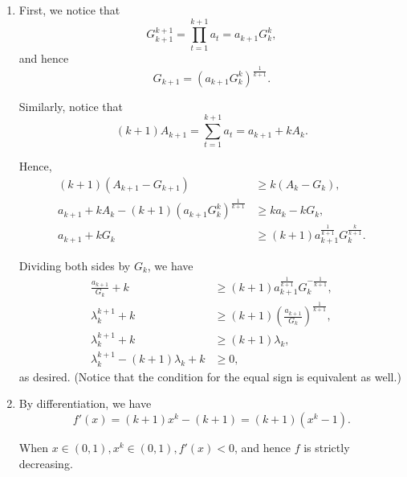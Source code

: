 \Question{\currfilebase}

\begin{enumerate}
    \item First, we notice that
          \[
              G_{k + 1}^{k + 1} = \prod_{t = 1}^{k + 1} a_t = a_{k + 1} G_{k}^{k},
          \]
          and hence
          \[
              G_{k + 1} = \left(a_{k + 1} G_{k}^{k}\right)^{\frac{1}{k + 1}}.
          \]

          Similarly, notice that
          \[
              (k + 1) A_{k + 1} = \sum_{t = 1}^{k + 1} a_t = a_{k + 1} + k A_{k}.
          \]

          Hence,
          \begin{align*}
              (k + 1)\left(A_{k + 1} - G_{k + 1}\right)                                      & \geq k\left(A_k - G_k\right),                                    \\
              a_{k + 1} + k A_k - (k + 1) \left(a_{k + 1} G_{k}^{k}\right)^{\frac{1}{k + 1}} & \geq k a_k - k G_k,                                              \\
              a_{k + 1} + k G_k                                                              & \geq (k + 1)a_{k + 1}^{\frac{1}{k + 1}} G_{k}^{\frac{k}{k + 1}}.
          \end{align*}

          Dividing both sides by \(G_k\), we have
          \begin{align*}
              \frac{a_{k + 1}}{G_k} + k                 & \geq (k + 1) a_{k + 1}^{\frac{1}{k + 1}} G_k^{- \frac{1}{k + 1}},  \\
              \lambda_k^{k + 1} + k                     & \geq (k + 1) \left(\frac{a_{k + 1}}{G_k}\right)^{\frac{1}{k + 1}}, \\
              \lambda_k^{k + 1} + k                     & \geq (k + 1) \lambda_k,                                            \\
              \lambda_k^{k + 1} - (k + 1) \lambda_k + k & \geq 0,
          \end{align*}
          as desired. (Notice that the condition for the equal sign is equivalent as well.)

    \item By differentiation, we have
          \[
              f'(x) = (k + 1)x^k - (k + 1) = (k + 1) (x^k - 1).
          \]

          When \(x \in (0, 1), x^k \in (0, 1), f'(x) < 0\), and hence \(f\) is strictly decreasing.


\end{enumerate}
